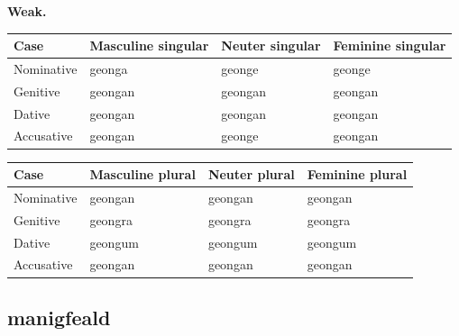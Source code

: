 \textbf{Weak.}

\par\begingroup
\fontsize{10.5}{13.2}\selectfont
\setlength{\LTleft}{0pt}\setlength{\LTright}{\fill}
\noindent
\begin{tabular}{@{}>{\raggedright\arraybackslash}p{22.0mm}>{\raggedright\arraybackslash}p{31.188mm}>{\raggedright\arraybackslash}p{31.188mm}>{\raggedright\arraybackslash}p{31.188mm}@{}}
\toprule
\textbf{Case} & \textbf{Masculine singular} & \textbf{Neuter singular} & \textbf{Feminine singular} \\
\midrule
Nominative & geonga & geonge & geonge \\
Genitive & geongan & geongan & geongan \\
Dative & geongan & geongan & geongan \\
Accusative & geongan & geonge & geongan \\
\bottomrule
\end{tabular}
\par\endgroup
\par\addvspace{5pt}
\par\begingroup
\fontsize{10.5}{13.2}\selectfont
\setlength{\LTleft}{0pt}\setlength{\LTright}{\fill}
\noindent
\begin{tabular}{@{}>{\raggedright\arraybackslash}p{22.0mm}>{\raggedright\arraybackslash}p{31.188mm}>{\raggedright\arraybackslash}p{31.188mm}>{\raggedright\arraybackslash}p{31.188mm}@{}}
\toprule
\textbf{Case} & \textbf{Masculine plural} & \textbf{Neuter plural} & \textbf{Feminine plural} \\
\midrule
Nominative & geongan & geongan & geongan \\
Genitive & geongra & geongra & geongra \\
Dative & geongum & geongum & geongum \\
Accusative & geongan & geongan & geongan \\
\bottomrule
\end{tabular}
\par\endgroup

\subsection*{manigfeald}


